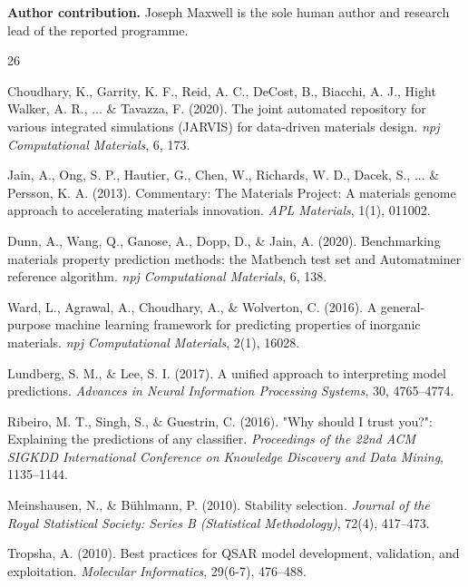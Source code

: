 \documentclass[11pt,a4paper,oneside]{report}
\begin{document}
\textbf{Author contribution.} Joseph Maxwell is the sole human author and research lead of the reported programme.



\clearpage
\begin{thebibliography}{26}

Choudhary, K., Garrity, K. F., Reid, A. C., DeCost, B., Biacchi, A. J., Hight Walker, A. R., ... \& Tavazza, F. (2020). The joint automated repository for various integrated simulations (JARVIS) for data-driven materials design. \emph{npj Computational Materials}, 6, 173.

Jain, A., Ong, S. P., Hautier, G., Chen, W., Richards, W. D., Dacek, S., ... \& Persson, K. A. (2013). Commentary: The Materials Project: A materials genome approach to accelerating materials innovation. \emph{APL Materials}, 1(1), 011002.

Dunn, A., Wang, Q., Ganose, A., Dopp, D., \& Jain, A. (2020). Benchmarking materials property prediction methods: the Matbench test set and Automatminer reference algorithm. \emph{npj Computational Materials}, 6, 138.

Ward, L., Agrawal, A., Choudhary, A., \& Wolverton, C. (2016). A general-purpose machine learning framework for predicting properties of inorganic materials. \emph{npj Computational Materials}, 2(1), 16028.

Lundberg, S. M., \& Lee, S. I. (2017). A unified approach to interpreting model predictions. \emph{Advances in Neural Information Processing Systems}, 30, 4765--4774.

Ribeiro, M. T., Singh, S., \& Guestrin, C. (2016). "Why should I trust you?": Explaining the predictions of any classifier. \emph{Proceedings of the 22nd ACM SIGKDD International Conference on Knowledge Discovery and Data Mining}, 1135--1144.

Meinshausen, N., \& B{\"u}hlmann, P. (2010). Stability selection. \emph{Journal of the Royal Statistical Society: Series B (Statistical Methodology)}, 72(4), 417--473.

Tropsha, A. (2010). Best practices for QSAR model development, validation, and exploitation. \emph{Molecular Informatics}, 29(6-7), 476--488.


\end{thebibliography}
\end{document}
